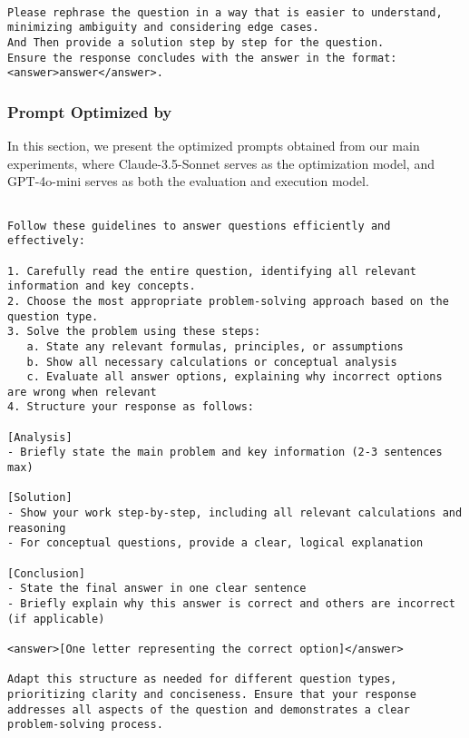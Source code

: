 \begin{tcolorbox}[title={\textbf{\small Rephrase Prompt}}, boxrule=2pt, arc=0mm, breakable]
\begin{verbatim}

Please rephrase the question in a way that is easier to understand, minimizing ambiguity and considering edge cases.
And Then provide a solution step by step for the question.
Ensure the response concludes with the answer in the format:
<answer>answer</answer>.

\end{verbatim}
\end{tcolorbox}

\subsubsection{Prompt Optimized by \ours}

In this section, we present the optimized prompts obtained from our main experiments, where Claude-3.5-Sonnet serves as the optimization model, and GPT-4o-mini serves as both the evaluation and execution model.

\begin{tcolorbox}[title={\textbf{\small GPQA Prompt}}, boxrule=2pt, arc=0mm, breakable]
\begin{verbatim}

Follow these guidelines to answer questions efficiently and effectively:

1. Carefully read the entire question, identifying all relevant information and key concepts.
2. Choose the most appropriate problem-solving approach based on the question type.
3. Solve the problem using these steps:
   a. State any relevant formulas, principles, or assumptions
   b. Show all necessary calculations or conceptual analysis
   c. Evaluate all answer options, explaining why incorrect options are wrong when relevant
4. Structure your response as follows:

[Analysis]
- Briefly state the main problem and key information (2-3 sentences max)

[Solution]
- Show your work step-by-step, including all relevant calculations and reasoning
- For conceptual questions, provide a clear, logical explanation

[Conclusion]
- State the final answer in one clear sentence
- Briefly explain why this answer is correct and others are incorrect (if applicable)

<answer>[One letter representing the correct option]</answer>

Adapt this structure as needed for different question types, prioritizing clarity and conciseness. Ensure that your response addresses all aspects of the question and demonstrates a clear problem-solving process.

\end{verbatim}
\end{tcolorbox}

